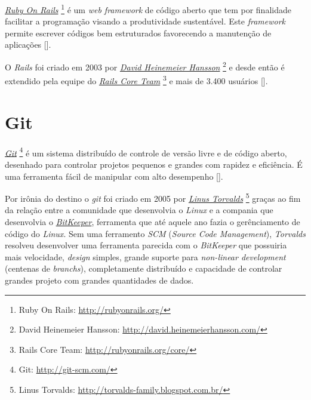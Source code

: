 \emph{\href{http://rubyonrails.org/}{Ruby On Rails}} \footnote{Ruby On Rails: \url{http://rubyonrails.org/}} 
é um \emph{web framework} de código aberto que tem por finalidade facilitar a programação
visando a produtividade sustentável. Este \emph{framework} permite escrever códigos bem estruturados
favorecendo a manutenção de aplicações [].

O \emph{Rails} foi criado em 2003 por \emph{\href{http://david.heinemeierhansson.com/}{David Heinemeier Hansson}}
\footnote{David Heinemeier Hansson: \url{http://david.heinemeierhansson.com/}} e desde então é extendido 
pela equipe do \emph{\href{http://rubyonrails.org/core/}{Rails Core Team}} 
\footnote{Rails Core Team: \url{http://rubyonrails.org/core/}} e mais de 3.400 usuários 
[].

\section{Git}
\label{section:git}

\emph{\href{http://git-scm.com/}{Git}} \footnote{Git: \url{http://git-scm.com/}} é um sistema distribuído de 
controle de versão livre e de código aberto, desenhado para controlar projetos pequenos e grandes com 
rapidez e eficiência. É uma ferramenta fácil de manipular com alto desempenho [].

Por irônia do destino o \emph{git} foi criado em 2005 por 
\emph{\href{http://torvalds-family.blogspot.com.br/}{Linus Torvalds}} 
\footnote{Linus Torvalds: \url{http://torvalds-family.blogspot.com.br/}} graças ao fim da relação entre a 
comunidade que desenvolvia o \emph{Linux} e a compania que desenvolvia o 
\emph{\href{http://www.bitkeeper.com/}{BitKeeper}}, ferramenta que até aquele ano fazia o gerênciamento de 
código do \emph{Linux}. Sem uma ferramento \emph{SCM} (\emph{Source Code Management}), \emph{Torvalds} 
resolveu desenvolver uma ferramenta parecida com o \emph{BitKeeper} que possuiria mais velocidade,
\emph{design} simples, grande suporte para \emph{non-linear development} (centenas de \emph{branchs}), 
completamente distribuído e capacidade de controlar grandes projeto com grandes quantidades de dados.